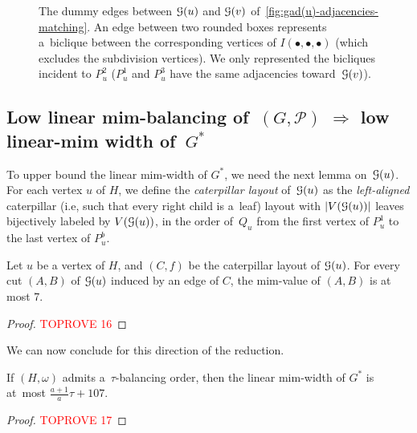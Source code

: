 \documentclass[a4paper,UKenglish,cleveref,hyperref,autoref]{lipics-v2021}
\begin{document}
\begin{figure}[h!]
  \caption{The dummy edges between $\mathcal G(u)$ and $\mathcal G(v)$ of~\cref{fig:gad(u)-adjacencies-matching}.
  An edge between two rounded boxes represents a~biclique between the corresponding vertices of $I(\bullet,\bullet,\bullet)$ (which excludes the subdivision vertices).
  We only represented the bicliques incident to $P_u^2$ ($P_u^1$ and $P_u^3$ have the same adjacencies toward~$\mathcal G(v)$). }
  \label{fig:gad(u)-adjacencies-dummy}
\end{figure}

\subsection{Low linear mim-balancing of~$(G,\mathcal P)$ $\Rightarrow$ low linear-mim width of~$G^*$}\label{sec:lin-mim-balancing-to-lin-mim-width}

To upper bound the linear mim-width of $G^*$, we need the next lemma on~$\mathcal G(u)$.
For each vertex $u$ of $H$, we define the \emph{caterpillar layout} of~$\mathcal G(u)$ as the \emph{left-aligned} caterpillar (i.e, such that every right child is a~leaf) layout with $|V(\mathcal G(u))|$ leaves bijectively labeled by $V(\mathcal G(u))$, in the order of~$Q_u$ from the first vertex of $P_u^1$ to the last vertex of $P_u^b$.

\begin{lemma}\label{lem:mim-value:gadget}
Let $u$ be a vertex of $H$, and $(C,f)$ be the caterpillar layout of $\mathcal G(u)$. 
For every cut $(A,B)$ of $\mathcal G(u)$ induced by an edge of $C$, the mim-value of $(A,B)$ is at most 7.
\end{lemma}
\begin{proof}\textcolor{red}{TOPROVE 16}\end{proof}

We can now conclude for this direction of the reduction.

\begin{lemma}
If $(H, \omega)$ admits a~$\tau$-balancing order, then the linear mim-width of $G^*$ is at~most $\frac{a+1}{a} \tau + 107$.
\end{lemma}
\begin{proof}\textcolor{red}{TOPROVE 17}\end{proof}
\end{document}
